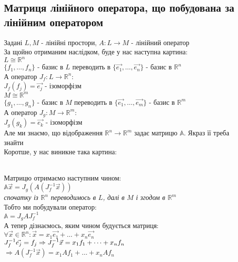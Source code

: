 \documentclass[a4paper, 14pt]{extarticle}
\begin{document}
	\subsection{Матриця лінійного оператора, що побудована за лінійним оператором}
	Задані $L,M$ - лінійні простори, $A: L \to M$ - лінійний оператор\\
	За щойно отриманим наслідком, буде у нас наступна картина:\\
	$L \cong \mathbb{R}^n$\\
	$\{f_1,\dots,f_n\}$ - базис в $L$ переводить в $\{\vec{e_1},\dots,\vec{e_n}\}$ - базис в $\mathbb{R}^n$\\
	А оператор $J_f: L \to \mathbb{R}^n$:\\
	$J_f(f_j) = \vec{e_j}$ - ізоморфізм\\
	$M \cong \mathbb{R}^m$\\
	$\{g_1,\dots,g_n\}$ - базис в $M$ переводить в $\{\vec{e_1},\dots,\vec{e_m}\}$ - базис в $\mathbb{R}^m$\\
	А оператор $J_g: M \to \mathbb{R}^m$:\\
	$J_g(g_k) = \vec{e_k}$ - ізоморфізм\\
	Але ми знаємо, що відображення $\mathbb{R}^n \to \mathbb{R}^m$ задає матрицю $\mathbb{A}$. Якраз її треба знайти
	\\
	Коротше, у нас виникне така картина:\\
	\\
	Матрицю отримаємо наступним чином:\\
	$\mathbb{A}\vec{x} = J_g(A(J^{-1}_f\vec{x}))$\\
	\textit{спочатку із $\mathbb{R}^n$ переводимось в $L$, далі в $M$ і згодом в $\mathbb{R}^m$}\\
	Тобто ми побудували оператор:\\
	$\mathbb{A} = J_g A J_f^{-1}$\\
	А тепер дізнаємось, яким чином будується матриця:\\
	$\forall \vec{x} \in \mathbb{R}^n: \vec{x} = x_1 \vec{e_1}+ \dots + x_n \vec{e_n}$\\
	$J_f^{-1} \vec{e_j} = f_j \\ \Rightarrow J_f^{-1} \vec{x} = x_1f_1+\dots+x_nf_n$\\
	$\Rightarrow A(J_f^{-1}\vec{x}) = x_1Af_1 + \dots + x_nAf_n$\\
\end{document}
